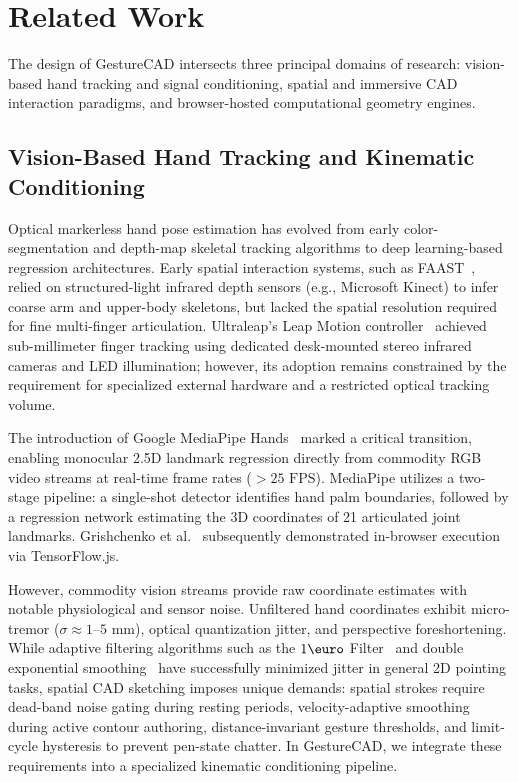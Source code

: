 \section{Related Work}
\label{sec:related_work}

The design of GestureCAD intersects three principal domains of research: vision-based hand tracking and signal conditioning, spatial and immersive CAD interaction paradigms, and browser-hosted computational geometry engines.

\subsection{Vision-Based Hand Tracking and Kinematic Conditioning}
Optical markerless hand pose estimation has evolved from early color-segmentation and depth-map skeletal tracking algorithms to deep learning-based regression architectures. Early spatial interaction systems, such as FAAST~\cite{suma2011faast}, relied on structured-light infrared depth sensors (e.g., Microsoft Kinect) to infer coarse arm and upper-body skeletons, but lacked the spatial resolution required for fine multi-finger articulation. Ultraleap's Leap Motion controller~\cite{leapmotion2013} achieved sub-millimeter finger tracking using dedicated desk-mounted stereo infrared cameras and LED illumination; however, its adoption remains constrained by the requirement for specialized external hardware and a restricted optical tracking volume.

The introduction of Google MediaPipe Hands~\cite{zhang2020mediapipe,lugaresi2019mediapipe} marked a critical transition, enabling monocular 2.5D landmark regression directly from commodity RGB video streams at real-time frame rates ($> 25\text{ FPS}$). MediaPipe utilizes a two-stage pipeline: a single-shot detector identifies hand palm boundaries, followed by a regression network estimating the 3D coordinates of 21 articulated joint landmarks. Grishchenko et al.~\cite{ACP2020handpose} subsequently demonstrated in-browser execution via TensorFlow.js.

However, commodity vision streams provide raw coordinate estimates with notable physiological and sensor noise. Unfiltered hand coordinates exhibit micro-tremor ($\sigma \approx 1$--$5\text{ mm}$), optical quantization jitter, and perspective foreshortening. While adaptive filtering algorithms such as the $1\text{\euro}$ Filter~\cite{casiez2012oneeuro} and double exponential smoothing~\cite{laviola2003double} have successfully minimized jitter in general 2D pointing tasks, spatial CAD sketching imposes unique demands: spatial strokes require dead-band noise gating during resting periods, velocity-adaptive smoothing during active contour authoring, distance-invariant gesture thresholds, and limit-cycle hysteresis to prevent pen-state chatter. In GestureCAD, we integrate these requirements into a specialized kinematic conditioning pipeline.

